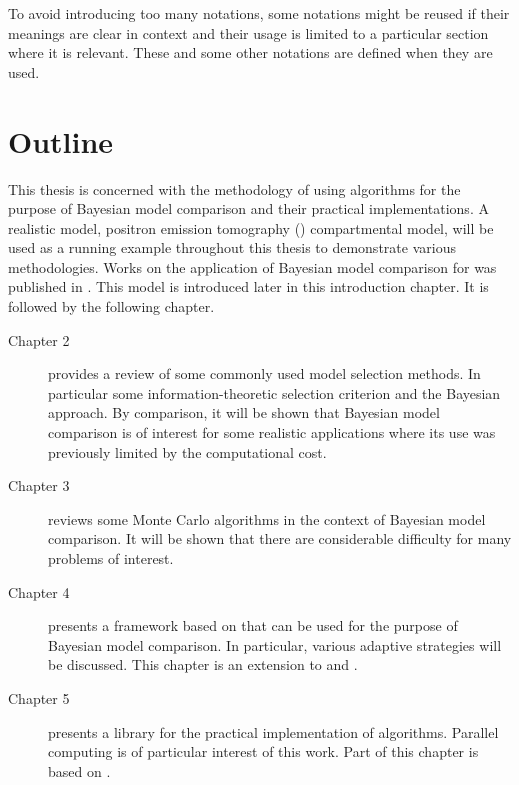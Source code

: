 To avoid introducing too many notations, some notations might be reused if
their meanings are clear in context and their usage is limited to a
particular section where it is relevant. These and some other notations are
defined when they are used.

\section{Outline}
\label{sec:Outline}

This thesis is concerned with the methodology of using \smc algorithms for the
purpose of Bayesian model comparison and their practical implementations. A
realistic model, positron emission tomography (\pet) compartmental model, will
be used as a running example throughout this thesis to demonstrate various
methodologies. Works on the application of Bayesian model comparison for \pet
was published in \cite{Zhou2013}. This model is introduced later in this
introduction chapter. It is followed by the following chapter.
\begin{description}
  \item[Chapter 2] provides a review of some commonly used model selection
    methods. In particular some information-theoretic selection criterion and
    the Bayesian approach. By comparison, it will be shown that Bayesian model
    comparison is of interest for some realistic applications where its
    use was previously limited by the computational cost.
  \item[Chapter 3] reviews some Monte Carlo algorithms in the context of
    Bayesian model comparison. It will be shown that there are considerable
    difficulty for many problems of interest.
  \item[Chapter 4] presents a framework based on \smc that can be used for the
    purpose of Bayesian model comparison. In particular, various adaptive
    strategies will be discussed. This chapter is an extension to
    \cite{Zhou:2012uz} and \cite{Zhou:2013vx}.
  \item[Chapter 5] presents a \cpp library for the practical implementation of
    \smc algorithms. Parallel computing is of particular interest of this
    work. Part of this chapter is based on \cite{vsmcjss}.
\end{description}
